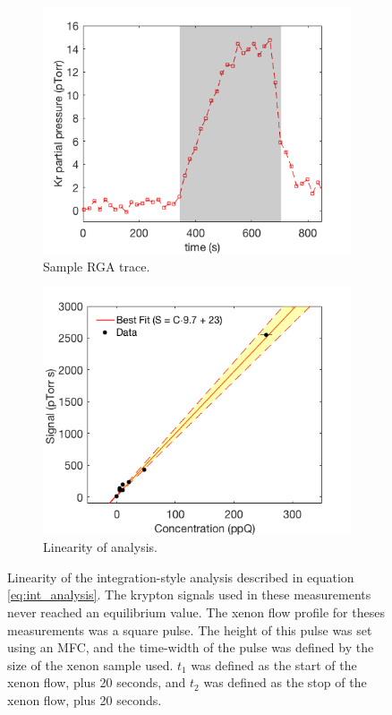 \documentclass[12pt]{article}
\begin{document}
\begin{figure}[h!]
\centering
\begin{subfigure}{0.5\textwidth}
  \centering
  \includegraphics[width=\textwidth]{Figures/RGATrace_int.png}
  \caption{Sample RGA trace.}
  \label{fig:RGAtrace2}
\end{subfigure}%
\begin{subfigure}{0.5\textwidth}
  \centering
  \includegraphics[width=\textwidth]{Figures/LinPlot0217.png}
  \caption{Linearity of analysis.}
  \label{fig:intlin}
\end{subfigure}
\caption{Linearity of the integration-style analysis described in equation \ref{eq:int_analysis}. The krypton signals used in these measurements never reached an equilibrium value. The xenon flow profile for theses measurements was a square pulse. The height of this pulse was set using an MFC, and the time-width of the pulse was defined by the size of the xenon sample used. $t_1$ was defined as the start of the xenon flow, plus 20 seconds, and $t_2$ was defined as the stop of the xenon flow, plus 20 seconds.}
\label{fig:linplot}
\end{figure}
\end{document}
